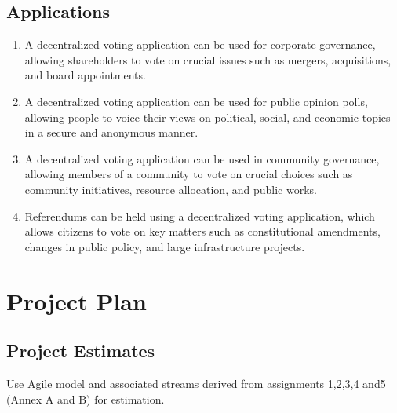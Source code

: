 \documentclass[oneside, 12pt]{book}
\begin{document}
\subsection{Applications}
\begin{enumerate}
	\item A decentralized voting application can be used for corporate governance, allowing shareholders to vote on crucial issues such as mergers, acquisitions, and board appointments.
	\item A decentralized voting application can be used for public opinion polls, allowing people to voice their views on political, social, and economic topics in a secure and anonymous manner.
	\item A decentralized voting application can be used in community governance, allowing members of a community to vote on crucial choices such as community initiatives, resource allocation, and public works.
	\item Referendums can be held using a decentralized voting application, which allows citizens to vote on key matters such as constitutional amendments, changes in public policy, and large infrastructure projects.
\end{enumerate}
\newpage
\section{Project Plan}
\newpage
\subsection{Project Estimates}
Use Agile model and associated streams derived from assignments 1,2,3,4 and5 (Annex A and B) for estimation.
\end{document}
